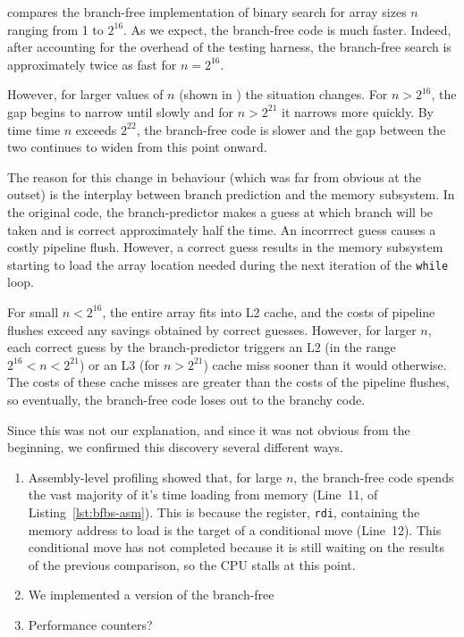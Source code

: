 \documentclass{patmorin}
\newcommand{\lstref}[1]{Listing~\ref{lst:#1}}
\begin{document}
 compares the branch-free implementation
of binary search for array sizes $n$ ranging from 1 to $2^{16}$.  As we
expect, the branch-free code is much faster. Indeed, after accounting
for the overhead of the testing harness, the branch-free search is
approximately twice as fast for $n=2^{16}$.

However, for larger values of $n$ (shown in )
the situation changes.  For $n>2^{16}$, the gap begins to narrow until
slowly and for $n>2^{21}$ it narrows more quickly.  By time time $n$
exceeds $2^{22}$, the branch-free code is slower and the gap between
the two continues to widen from this point onward.

The reason for this change in behaviour (which was far from obvious at
the outset) is the interplay between branch prediction and the memory
subsystem.  In the original code, the branch-predictor makes a guess at
which branch will be taken and is correct approximately half the time. An
incorrrect guess causes a costly pipeline flush.  However, a correct
guess results in the memory subsystem starting to load the array location
needed during the next iteration of the \texttt{while} loop.

For small $n<2^{16}$, the entire array fits into L2 cache, and the costs
of pipeline flushes exceed any savings obtained by correct guesses.
However, for larger $n$, each correct guess by the branch-predictor
triggers an L2 (in the range $2^{16}<n<2^{21}$) or an L3 (for $n>2^{21}$)
cache miss sooner than it would otherwise.  The costs of these cache
misses are greater than the costs of the pipeline flushes, so eventually,
the branch-free code loses out to the branchy code.

Since this was not our explanation, and since it was not obvious from
the beginning, we confirmed this discovery several different ways.

\begin{enumerate}
\item Assembly-level profiling showed that, for large $n$, the
branch-free code spends the vast majority of it's time loading from
memory (Line~11, of \lstref{bfbs-asm}).  This is because the register,
\texttt{rdi},  containing the memory address to load is the
target of a conditional move (Line~12).  This conditional move has not
completed because it is still waiting on the results of the previous
comparison, so the CPU stalls at this point.

\item We implemented a version of the branch-free 

\item Performance counters?
\end{enumerate}
\end{document}
